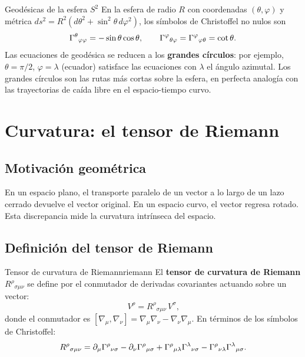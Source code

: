 \begin{ejemplo}{Geodésicas de la esfera $S^2$}{}
En la esfera de radio $R$ con coordenadas $(\theta, \varphi)$ y métrica $ds^2 = R^2(d\theta^2 + \sin^2\theta\, d\varphi^2)$, los símbolos de Christoffel no nulos son
\[
  \Gamma^{\theta}{}_{\varphi \varphi} = -\sin\theta\cos\theta,\qquad
  \Gamma^{\varphi}{}_{\theta \varphi} = \Gamma^{\varphi}{}_{\varphi \theta} = \cot\theta.
\]
Las ecuaciones de geodésica se reducen a los \textbf{grandes círculos}: por ejemplo, $\theta = \pi/2$, $\varphi = \lambda$ (ecuador) satisface las ecuaciones con $\lambda$ el ángulo azimutal. Los grandes círculos son las rutas más cortas sobre la esfera, en perfecta analogía con las trayectorias de caída libre en el espacio-tiempo curvo.
\end{ejemplo}

\section{Curvatura: el tensor de Riemann}

\subsection{Motivación geométrica}

En un espacio plano, el transporte paralelo de un vector a lo largo de un lazo cerrado devuelve el vector original. En un espacio curvo, el vector regresa rotado. Esta discrepancia mide la curvatura intrínseca del espacio.

\subsection{Definición del tensor de Riemann}

\begin{definicion}{Tensor de curvatura de Riemann}{riemann}
El \textbf{tensor de curvatura de Riemann} $R^\rho{}_{\sigma\mu\nu}$ se define por el conmutador de derivadas covariantes actuando sobre un vector:
\begin{equation}
  [\nabla_\mu, \nabla_\nu]\, V^\rho
  = R^\rho{}_{\sigma\mu\nu}\, V^\sigma,
  \label{eq:riemann_def}
\end{equation}
donde el conmutador es $[\nabla_\mu, \nabla_\nu] = \nabla_\mu \nabla_\nu - \nabla_\nu \nabla_\mu$.
En términos de los símbolos de Christoffel:
\begin{equation}
  R^\rho{}_{\sigma\mu\nu}
  = \partial_\mu \Gamma^{\rho}{}_{\nu \sigma}
  - \partial_\nu \Gamma^{\rho}{}_{\mu \sigma}
  + \Gamma^{\rho}{}_{\mu \lambda}\Gamma^{\lambda}{}_{\nu \sigma}
  - \Gamma^{\rho}{}_{\nu \lambda}\Gamma^{\lambda}{}_{\mu \sigma}.
  \label{eq:riemann_christoffel}
\end{equation}
\end{definicion}

